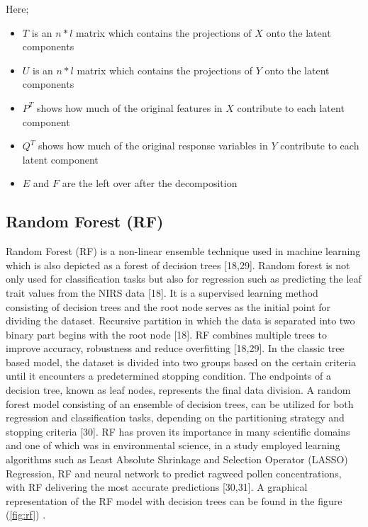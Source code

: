 \documentclass[12pt,a4paper]{report}
\begin{document}
Here;
\begin{itemize}
    \item $T$ is an $n*l$ matrix which contains the projections of $X$ onto the latent components
    \item $U$ is an $n*l$ matrix which contains the projections of $Y$ onto the latent components
    \item $P^T$ shows how much of the original features in $X$ contribute to each latent component
    \item $Q^T$ shows how much of the original response variables in $Y$ contribute to each latent component
    \item $E$ and $F$ are the left over after the decomposition
\end{itemize}





\subsection{Random Forest (RF)}
Random Forest (RF) is a non-linear ensemble technique used in machine learning which is also depicted as a forest of decision trees [18,29]. Random forest is not only used for classification tasks but also for regression such as predicting the leaf trait values from the NIRS data [18]. It is a supervised learning method consisting of decision trees and the root node serves as the initial point for dividing the dataset. 
Recursive partition in which the data is separated into two binary part begins with the root node [18]. RF combines multiple trees to improve accuracy, robustness and reduce overfitting [18,29].
In the classic tree based model, the dataset is divided into two groups based on the certain criteria until it encounters a predetermined stopping condition. The endpoints of a decision tree, known as leaf nodes, 
represents the final data division. A random forest model consisting of an ensemble of decision trees, can be utilized for both regression and classification tasks, depending on the partitioning strategy and stopping criteria [30]. 
RF has proven its importance in many scientific domains and one of which was in environmental science, in a study employed learning algorithms such as Least Absolute Shrinkage and Selection Operator (LASSO) Regression, RF and neural network to 
predict ragweed pollen concentrations, with RF delivering the most accurate predictions [30,31]. A graphical representation of the RF model with decision trees can be found in the figure (\ref{fig:rf}) . \\
\end{document}
